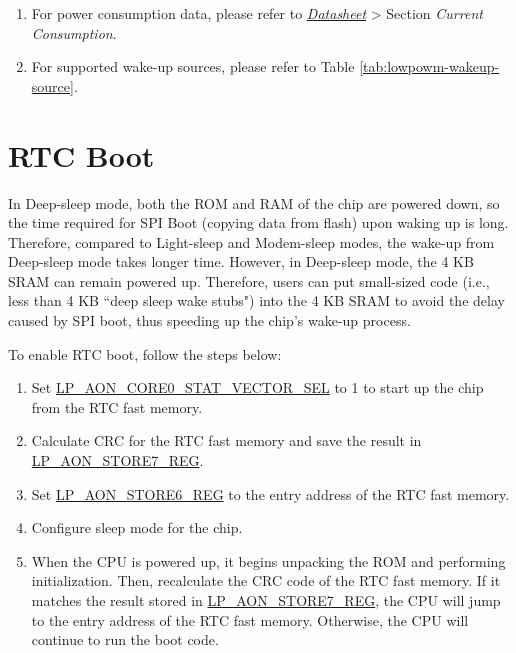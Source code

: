 \documentclass[main\_\_EN.tex]{subfiles}
\begin{document}
\begin{tiplisting}
\vspace{-2em}
\label{other:lowpowm-predefined-modes-notes}
\begin{enumerate}
    \item For power consumption data, please refer to \href{https://www.espressif.com/sites/default/files/documentation/esp32-c6_datasheet_en.pdf}{\it{\chipname{} Datasheet}} > Section \textit{Current Consumption}.
    \item For supported wake-up sources, please refer to Table \ref{tab:lowpowm-wakeup-source}.
\end{enumerate}
\end{tiplisting}

\section{RTC Boot}

In Deep-sleep mode, both the ROM and RAM of the chip are powered down, so the time required for SPI Boot (copying data from flash) upon waking up is long. Therefore, compared to Light-sleep and Modem-sleep modes, the wake-up from Deep-sleep mode takes longer time. However, in Deep-sleep mode, the 4 KB SRAM can remain powered up. Therefore, users can put small-sized code (i.e., less than 4 KB ``deep sleep wake stubs") into the 4 KB SRAM to avoid the delay caused by SPI boot, thus speeding up the chip's wake-up process.

To enable RTC boot, follow the steps below:

\begin{enumerate}
    \item Set \hyperref[fielddesc:LPAONCORE0STATVECTORSEL]{LP\_AON\_CORE0\_STAT\_VECTOR\_SEL} to 1 to start up the chip from the RTC fast memory.

    \item Calculate CRC for the RTC fast memory and save the result in \hyperref[regdesc:LPAONSTORENREG]{LP\_AON\_STORE7\_REG}.

    \item Set \hyperref[regdesc:LPAONSTORENREG]{LP\_AON\_STORE6\_REG} to the entry address of the RTC fast memory.

    \item Configure sleep mode for the chip.

    \item When the CPU is powered up, it begins unpacking the ROM and performing initialization. Then, recalculate the CRC code of the RTC fast memory. If it matches the result stored in \hyperref[regdesc:LPAONSTORENREG]{LP\_AON\_STORE7\_REG}, the CPU will jump to the entry address of the RTC fast memory. Otherwise, the CPU will continue to run the boot code.

\end{enumerate}
\end{document}

